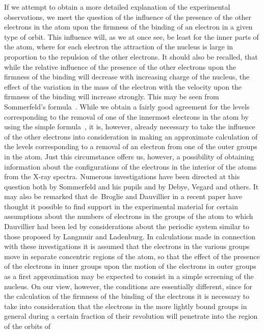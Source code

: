 If we attempt to obtain a more detailed explanation of the
experimental observations, we meet the question of the influence
of the presence of the other electrons in the atom upon the firmness
of the binding of an electron in a given type of orbit. This influence
will, as we at once see, be least for the inner parts of the atom,
where for each electron the attraction of the nucleus is large in
proportion to the repulsion of the other electrons. It should also
be recalled, that while the relative influence of the presence of the
other electrons upon the firmness of the binding will decrease with
increasing charge of the nucleus, the effect of the variation in the
mass of the electron with the velocity upon the firmness of the
binding will increase strongly. This may be seen from Sommerfeld's
formula~. While we obtain a fairly good agreement for the
levels corresponding to the removal of one of the innermost electrons
in the atom by using the simple formula~, it is, however, already
necessary to take the influence of the other electrons into consideration
in making an approximate calculation of the levels corresponding
to a removal of an electron from one of the outer groups in the
atom. Just this circumstance offers us, however, a possibility of
obtaining information about the configurations of the electrons in
the interior of the atoms from the X-ray spectra. Numerous
investigations have been directed at this question both by
Sommerfeld and his pupils and by Debye, Vegard and others. It
may also be remarked that de~Broglie and Dauvillier in a recent
paper have thought it possible to find support in the experimental
material for certain assumptions about the numbers of electrons in
the groups of the atom to which Dauvillier had been led by considerations
about the periodic system similar to those proposed by
Langmuir and Ladenburg. In calculations made in connection with
these investigations it is assumed that the electrons in the various
groups move in separate concentric regions of the atom, so that
the effect of the presence of the electrons in inner groups upon the
motion of the electrons in outer groups as a first approximation
may be expected to consist in a simple screening of the nucleus.
On our view, however, the conditions are essentially different, since
for the calculation of the firmness of the binding of the electrons
it is necessary to take into consideration that the electrons in the
more lightly bound groups in general during a certain fraction of
their revolution will penetrate into the region of the orbits of
